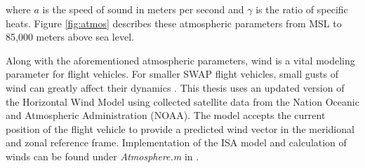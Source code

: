 \documentclass[../chapter_2.tex]{subfiles}
\begin{document}
where $a$ is the speed of sound in meters per second and $\gamma$ is the ratio of specific heats. Figure \ref{fig:atmos} describes these atmospheric parameters from MSL to 85,000 meters above sea level.

Along with the aforementioned atmospheric parameters, wind is a vital modeling parameter for flight vehicles. For smaller SWAP flight vehicles, small gusts of wind can greatly affect their dynamics \cite{raymerAircraftDesignConceptual2018}. This thesis uses an updated version of the Horizontal Wind Model \cite{drobEmpiricalModelEarth2008,drobUpdateHorizontalWind2015} using collected satellite data from the Nation Oceanic and Atmospheric Administration (NOAA). The model accepts the current position of the flight vehicle to provide a predicted wind vector in the meridional and zonal reference frame. Implementation of the ISA model and calculation of winds can be found under \textit{Atmosphere.m} in \cite{millerNsm0014thesis}.
\end{document}
